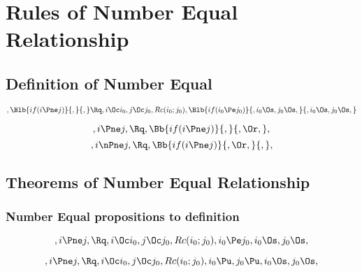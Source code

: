 \chapter{Rules of Number Equal Relationship}

\section{Definition of Number Equal}
\[,\Blb{if(i \Pne j)}{,}{,} \Rq , i \Oc i_0, j \Oc j_0, Rc(i_0; j_0), \Blb{if(i_0 \Pe j_0)}{,i_0 \Os, j_0 \Os, }{, i_0 \Os, j_0 \Os, }\]

\bigskip
\bigskip
\[, i \Pne j, \Rq , \Bb{if(i \Pne j)}{,}{, \Or,},\]
\bigskip
\bigskip
\[, i \nPne j, \Rq , \Bb{if(i \Pne j)}{, \Or,}{,},\]
\bigskip
\bigskip


\bigskip
\bigskip
\section{Theorems of Number Equal Relationship}
\subsection{Number Equal propositions to definition}
\[,i \Pne j, \Rq ,  i \Oc i_0, j \Oc j_0, Rc(i_0; j_0), i_0 \Pe j_0, i_0 \Os, j_0 \Os,\]




\[,i \Pne j, \Rq ,  i \Oc i_0, j \Oc j_0, Rc(i_0; j_0), i_0 \Pu, j_0 \Pu, i_0 \Os, j_0 \Os,\]

